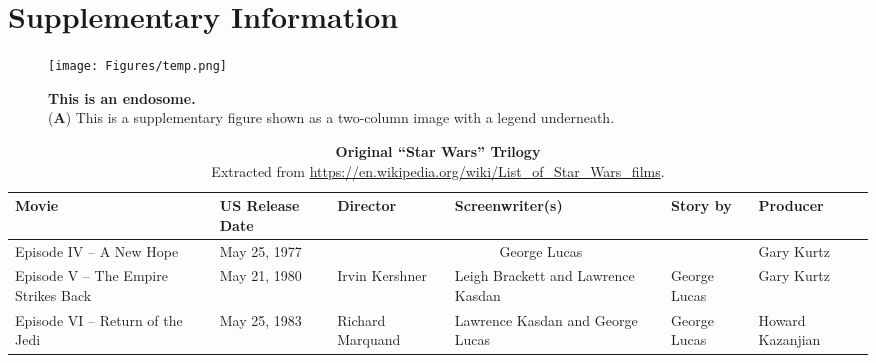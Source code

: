 
\onecolumn %
\fancyhead{} %
\renewcommand{\floatpagefraction}{0.1}
\lfoot[\bSupInf]{\dAuthor}
\rfoot[\dAuthor]{\cSupInf}
\newpage

\captionsetup*{format=largeformat} %
\setcounter{figure}{0} %
\setcounter{equation}{0} %
\setcounter{table}{0} %
\makeatletter 
\renewcommand{\thefigure}{S\@arabic\c@figure} %
\renewcommand{\thetable}{S\@arabic\c@table} %
\makeatother
\def\theequation{S\arabic{equation}}


\newpage
\section*{Supplementary Information}

\begin{figure*}[!ht]
\centering
\texttt{[image: Figures/temp.png]}
\caption{\textbf{This is an endosome.}\\
(\textbf{A}) This is a supplementary figure shown as a two-column image with a legend underneath.}
\label{suppfig:endosome}
\end{figure*}


\begin{table}[!h]
    \centering
    \small
    \begin{tabular}{p{3cm}|p{2.2cm} p{2.2cm} p{2.2cm} p{2.2cm} p{2.2cm}}
        Movie & US Release Date & Director & Screenwriter(s) & Story by & Producer\\
        \hline
        Episode IV – A New Hope & May 25, 1977 & \multicolumn{3}{c}{George Lucas} & Gary Kurtz\\
        Episode V – The Empire Strikes Back & May 21, 1980 & Irvin Kershner & Leigh Brackett and Lawrence Kasdan & George Lucas & Gary Kurtz\\
        Episode VI – Return of the Jedi & May 25, 1983 & Richard Marquand & Lawrence Kasdan and George Lucas & George Lucas & Howard Kazanjian\\
    \end{tabular}
    \caption{\textbf{Original ``Star Wars'' Trilogy}\\
    Extracted from \url{https://en.wikipedia.org/wiki/List_of_Star_Wars_films}.}
    \label{supptab:st1}
\end{table}


